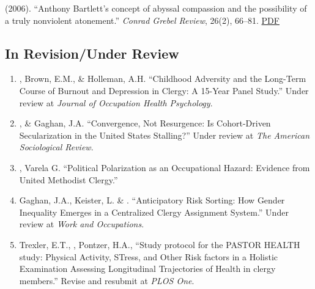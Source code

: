 \begin{etaremune}
\item \Eagle\hspace{.01em} (2006). ``Anthony Bartlett's concept of abyssal compassion and the possibility of a truly nonviolent atonement.'' \emph{Conrad Grebel Review}, 26(2), 66--81. \href{https://www.davideagle.org/publication/eagle-anthony-bartlett-concept-2006/eagle-anthony-bartlett-concept-2006.pdf}{PDF}

\end{etaremune}

\subsection*{In Revision/Under Review}
\begin{enumerate}
	
\item \Eagle, Brown, E.M., \& Holleman, A.H. ``Childhood Adversity and the Long-Term Course of Burnout and Depression in Clergy: A 15-Year Panel Study.'' Under review at \textit{Journal of Occupation Health Psychology}. 

\item \Eagle, \& Gaghan, J.A. ``Convergence, Not Resurgence: Is Cohort-Driven Secularization in the United States Stalling?'' Under review at \textit{The American Sociological Review}.

\item \Eagle, Varela G. ``Political Polarization as an Occupational Hazard: Evidence from United Methodist Clergy.'' 

\item Gaghan, J.A., Keister, L. \& \Eagle. ``Anticipatory Risk Sorting: How Gender Inequality Emerges in a Centralized Clergy Assignment System.'' Under review at \textit{Work and Occupations}.

\item Trexler, E.T., \Eagle, Pontzer, H.A., ``Study protocol for the PASTOR HEALTH study: Physical Activity, STress, and Other Risk factors in a Holistic Examination Assessing Longitudinal Trajectories of Health in clergy members.'' Revise and resubmit at \textit{PLOS One}.
	
\end{enumerate}


